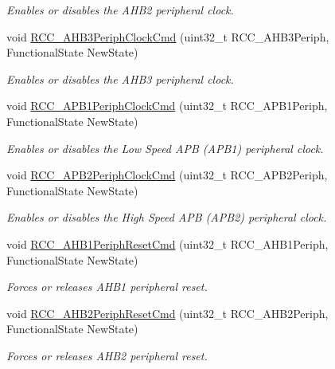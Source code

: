 \begin{DoxyCompactItemize}
\begin{DoxyCompactList}\small\item\em Enables or disables the A\+H\+B2 peripheral clock. \end{DoxyCompactList}\item 
void \hyperlink{group___r_c_c___group3_ga4eb8c119f2e9bf2bd2e042d27f151338}{R\+C\+C\+\_\+\+A\+H\+B3\+Periph\+Clock\+Cmd} (uint32\+\_\+t R\+C\+C\+\_\+\+A\+H\+B3\+Periph, Functional\+State New\+State)
\begin{DoxyCompactList}\small\item\em Enables or disables the A\+H\+B3 peripheral clock. \end{DoxyCompactList}\item 
void \hyperlink{group___r_c_c___group3_gaee7cc5d73af7fe1986fceff8afd3973e}{R\+C\+C\+\_\+\+A\+P\+B1\+Periph\+Clock\+Cmd} (uint32\+\_\+t R\+C\+C\+\_\+\+A\+P\+B1\+Periph, Functional\+State New\+State)
\begin{DoxyCompactList}\small\item\em Enables or disables the Low Speed A\+PB (A\+P\+B1) peripheral clock. \end{DoxyCompactList}\item 
void \hyperlink{group___r_c_c___group3_ga56ff55caf8d835351916b40dd030bc87}{R\+C\+C\+\_\+\+A\+P\+B2\+Periph\+Clock\+Cmd} (uint32\+\_\+t R\+C\+C\+\_\+\+A\+P\+B2\+Periph, Functional\+State New\+State)
\begin{DoxyCompactList}\small\item\em Enables or disables the High Speed A\+PB (A\+P\+B2) peripheral clock. \end{DoxyCompactList}\item 
void \hyperlink{group___r_c_c___group3_gaa7c450567f4731d4f0615f63586cad86}{R\+C\+C\+\_\+\+A\+H\+B1\+Periph\+Reset\+Cmd} (uint32\+\_\+t R\+C\+C\+\_\+\+A\+H\+B1\+Periph, Functional\+State New\+State)
\begin{DoxyCompactList}\small\item\em Forces or releases A\+H\+B1 peripheral reset. \end{DoxyCompactList}\item 
void \hyperlink{group___r_c_c___group3_gafb119d6d1955d1b8c361e8140845ac5a}{R\+C\+C\+\_\+\+A\+H\+B2\+Periph\+Reset\+Cmd} (uint32\+\_\+t R\+C\+C\+\_\+\+A\+H\+B2\+Periph, Functional\+State New\+State)
\begin{DoxyCompactList}\small\item\em Forces or releases A\+H\+B2 peripheral reset. \end{DoxyCompactList}\item 

\end{DoxyCompactItemize}
